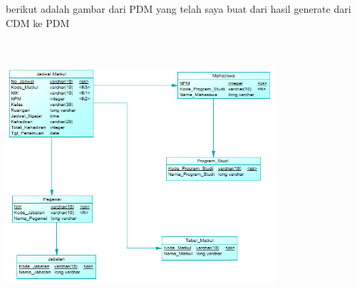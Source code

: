 \documentclass[12pt]{article}
\begin{document}
berikut adalah gambar dari PDM yang telah saya buat dari hasil generate dari CDM ke PDM

\begin{center}
\includegraphics[width=10cm, height=10cm]{PDM.png}
\end{center}
        
\end{document}
